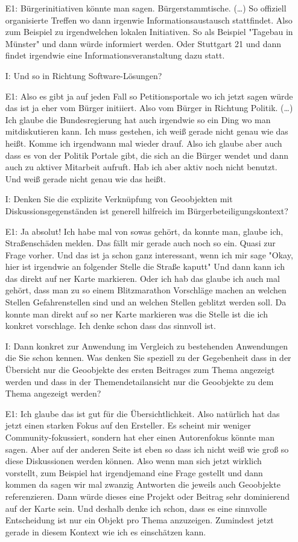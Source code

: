 \begin{itemize}
    \item[E1:] B{\"u}rgerinitiativen k{\"o}nnte man sagen. B{\"u}rgerstammtische. (\dots) So offiziell organisierte Treffen wo dann irgenwie Informationsaustausch stattfindet. Also zum Beispiel zu irgendwelchen lokalen Initiativen. So als Beispiel "Tagebau in M{\"u}nster" und dann w{\"u}rde informiert werden. Oder Stuttgart 21 und dann findet irgendwie eine Informationsveranstaltung dazu statt. 
    \item[I:] Und so in Richtung Software-L{\"o}sungen?
    \item[E1:] Also es gibt ja auf jeden Fall so Petitionsportale wo ich jetzt sagen w{\"u}rde das ist ja eher vom B{\"u}rger initiiert. Also vom B{\"u}rger in Richtung Politik. (\dots) Ich glaube die Bundesregierung hat auch irgendwie so ein Ding wo man mitdiskutieren kann. Ich muss gestehen, ich wei{\ss} gerade nicht genau wie das hei{\ss}t. Komme ich irgendwann mal wieder drauf. Also ich glaube aber auch dass es von der Politik Portale gibt, die sich an die B{\"u}rger wendet und dann auch zu aktiver Mitarbeit aufruft. Hab ich aber aktiv noch nicht benutzt. Und wei{\ss} gerade nicht genau wie das hei{\ss}t. 
    \item[I:] Denken Sie die explizite Verkn{\"u}pfung von Geoobjekten mit Diskussionsgegenst{\"a}nden ist generell hilfreich im B{\"u}rgerbeteiligungskontext?
    \item[E1:] Ja absolut! Ich habe mal von sowas geh{\"o}rt, da konnte man, glaube ich, Stra{\ss}ensch{\"a}den melden. Das f{\"a}llt mir gerade auch noch so ein. Quasi zur Frage vorher. Und das ist ja schon ganz interessant, wenn ich mir sage "Okay, hier ist irgendwie an folgender Stelle die Stra{\ss}e kaputt" Und dann kann ich das direkt auf ner Karte markieren. Oder ich hab das glaube ich auch mal geh{\"o}rt, dass man zu so einem Blitzmarathon Vorschl{\"a}ge machen an welchen Stellen Gefahrenstellen sind und an welchen Stellen geblitzt werden soll. Da konnte man direkt auf so ner Karte markieren was die Stelle ist die ich konkret vorschlage. Ich denke schon dass das sinnvoll ist. 
    \item[I:] Dann konkret zur Anwendung im Vergleich zu bestehenden Anwendungen die Sie schon kennen. Was denken Sie speziell zu der Gegebenheit dass in der {\"U}bersicht nur die Geoobjekte des ersten Beitrages zum Thema angezeigt werden und dass in der Themendetailansicht nur die Geoobjekte zu dem Thema angezeigt werden?
    \item[E1:] Ich glaube das ist gut f{\"u}r die {\"U}bersichtlichkeit. Also nat{\"u}rlich hat das jetzt einen starken Fokus auf den Ersteller. Es scheint mir weniger Community-fokussiert, sondern hat eher einen Autorenfokus k{\"o}nnte man sagen. Aber auf der anderen Seite ist eben so dass ich nicht wei{\ss} wie gro{\ss} so diese Diskussionen werden k{\"o}nnen. Also wenn man sich jetzt wirklich vorstellt, zum Beispiel hat irgendjemand eine Frage gestellt und dann kommen da sagen wir mal zwanzig Antworten die jeweils auch Geoobjekte referenzieren. Dann w{\"u}rde dieses eine Projekt oder Beitrag sehr dominierend auf der Karte sein. Und deshalb denke ich schon, dass es eine sinnvolle Entscheidung ist nur ein Objekt pro Thema anzuzeigen. Zumindest jetzt gerade in diesem Kontext wie ich es einsch{\"a}tzen kann.

\end{itemize}
